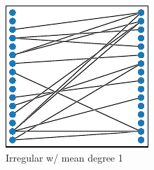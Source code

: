 \begin{figure}[!htbp]
\begin{center}
\begin{minipage}{0.05\textwidth}
\large
{}
\end{minipage}%
\begin{minipage}{0.95\textwidth}
\begin{minipage}{0.05\linewidth}
\large
{}
\end{minipage}%
\begin{minipage}{0.95\linewidth}
\begin{subfigure}[b]{0.5\textwidth}
\centering
\includegraphics[width=\textwidth]{img/graph_layouts/title=irregular-1+ext=}%
\caption{
Irregular w/ mean degree 1
}
\label{fig:irregular_1}
\end{subfigure}
\begin{subfigure}[b]{0.5\textwidth}
\centering

\end{subfigure}
\end{minipage}
\end{minipage}
\end{center}
\end{figure}
